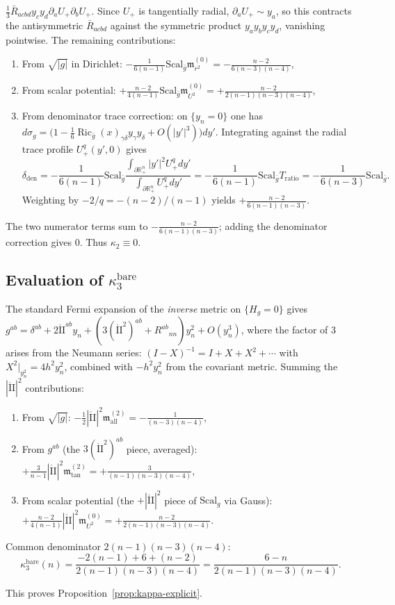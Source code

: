 \documentclass[11pt,reqno,a4paper]{amsart}
\DeclareMathOperator{\Ric}{Ric}
\numberwithin{equation}{section}
\theoremstyle{plain}
\newcommand{\Scal}{\mathrm{Scal}}
\theoremstyle{remark}
\theoremstyle{plain}
\begin{document}
$\frac{1}{3}\bar{R}_{acbd}y_cy_d\partial_aU_+\partial_bU_+$.
Since $U_+$ is tangentially radial, $\partial_aU_+\sim y_a$,
so this contracts the antisymmetric $\bar{R}_{acbd}$ against the symmetric product $y_ay_by_cy_d$,
vanishing pointwise. The remaining contributions:
\begin{enumerate}
\item From $\sqrt{|g|}$ in Dirichlet:
$-\frac{1}{6(n-1)}\Scal_{\bar g}\mathfrak{m}_{r^2}^{(0)}
= -\frac{n-2}{6(n-3)(n-4)}$,
\item From scalar potential:
$+\frac{n-2}{4(n-1)}\Scal_{\bar g}\mathfrak{m}_{U^2}^{(0)}
= +\frac{n-2}{2(n-1)(n-3)(n-4)}$,
\item From denominator trace correction:
on $\{y_n=0\}$ one has
$d\sigma_g = \bigl(1-\frac16\Ric_{\bar g}(x)_{\gamma\delta}y_\gamma y_\delta+O(|y'|^3)\bigr)dy'$.
Integrating against the radial trace profile $U_+^q(y',0)$ gives
\[
\delta_{\mathrm{den}}
= -\frac{1}{6(n-1)}\Scal_{\bar g}
\frac{\int_{\partial\mathbb R^n_+}|y'|^2 U_+^qdy'}{\int_{\partial\mathbb R^n_+}U_+^qdy'}
= -\frac{1}{6(n-1)}\Scal_{\bar g}T_{\mathrm{ratio}}
= -\frac{1}{6(n-3)}\Scal_{\bar g}.
\]
Weighting by $-2/q = -(n-2)/(n-1)$ yields $+\frac{n-2}{6(n-1)(n-3)}$.
\end{enumerate}
The two numerator terms sum to $-\frac{n-2}{6(n-1)(n-3)}$;
adding the denominator correction gives $0$. Thus $\kappa_2 \equiv 0$.

\subsection*{Evaluation of \texorpdfstring{$\kappa_3^{\mathrm{bare}}$}{kappa3}}
The standard Fermi expansion of the \emph{inverse} metric on $\{H_g=0\}$ gives
$g^{ab} = \delta^{ab} + 2\mathring{\mathrm{II}}^{ab}y_n
+ (3(\mathring{\mathrm{II}}^2)^{ab} + R^{ab}{}_{nn})y_n^2 + O(y_n^3)$,
where the factor of $3$ arises from the Neumann series:
$(I - X)^{-1} = I + X + X^2 + \cdots$ with
$X^2|_{y_n^2} = 4h^2y_n^2$, combined with $-h^2y_n^2$ from the covariant metric.
Summing the $|\mathring{\mathrm{II}}|^2$ contributions:
\begin{enumerate}[leftmargin=1.5em]
\item From $\sqrt{|g|}$:
$-\frac{1}{2}|\mathring{\mathrm{II}}|^2\mathfrak{m}_{\mathrm{all}}^{(2)}
= -\frac{1}{(n-3)(n-4)}$,
\item From $g^{ab}$ (the $3(\mathring{\mathrm{II}}^2)^{ab}$ piece, averaged):
$+\frac{3}{n-1}|\mathring{\mathrm{II}}|^2\mathfrak{m}_{\mathrm{tan}}^{(2)}
= +\frac{3}{(n-1)(n-3)(n-4)}$,
\item From scalar potential (the $+|\mathring{\mathrm{II}}|^2$ piece of $\Scal_g$ via Gauss):
$+\frac{n-2}{4(n-1)}|\mathring{\mathrm{II}}|^2\mathfrak{m}_{U^2}^{(0)}
= +\frac{n-2}{2(n-1)(n-3)(n-4)}$.
\end{enumerate}
Common denominator $2(n-1)(n-3)(n-4)$:
\[
\kappa_3^{\mathrm{bare}}(n)
= \frac{-2(n-1) + 6 + (n-2)}{2(n-1)(n-3)(n-4)}
= \frac{6-n}{2(n-1)(n-3)(n-4)}.
\]

\medskip
\noindent This proves Proposition~\ref{prop:kappa-explicit}.


\vspace{3mm}
\end{document}
